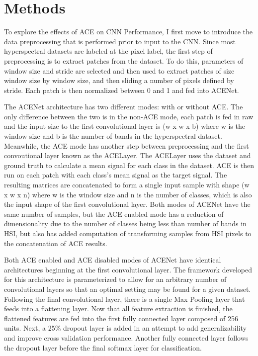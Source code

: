 \documentclass[12pt]{article}
\begin{document}
%
\section{Methods}\label{sec:methods}
To explore the effects of ACE on CNN Performance, I first move to introduce the data preprocessing that is performed prior to input to the CNN.
%
Since most hyperspectral datasets are labeled at the pixel label, the first step of preprocessing is to extract patches from the dataset.
%
To do this, parameters of window size and stride are selected and then used to extract patches of size window size by window size, and then sliding a number of pixels defined by stride.
%
Each patch is then normalized between 0 and 1 and fed into ACENet.

The ACENet architecture has two different modes: with or without ACE.
%
The only difference between the two is in the non-ACE mode, each patch is fed in raw and the input size to the first convolutional layer is (w x w x b) where w is the window size and b is the number of bands in the hyperspectral dataset.
%
Meanwhile, the ACE mode has another step between preprocessing and the first convoutional layer known as the ACELayer.
%
The ACELayer uses the dataset and ground truth to calculate a mean signal for each class in the dataset.
%
ACE is then run on each patch with each class's mean signal as the target signal. 
%
The resulting matrices are concatenated to form a single input sample with shape (w x w x n) where w is the window size and n is the number of classes, which is also the input shape of the first convolutional layer.
%
Both modes of ACENet have the same number of samples, but the ACE enabled mode has a reduction of dimensionality due to the number of classes being less than number of bands in HSI, but also has added computation of transforming samples from HSI pixels to the concatenation of ACE results.

Both ACE enabled and ACE disabled modes of ACENet have identical architectures beginning at the first convolutional layer.
%
The framework developed for this architecture is parameterized to allow for an arbitrary number of convolutional layers so that an optimal setting may be found for a given dataset.
%
Following the final convolutional layer, there is a single Max Pooling layer that feeds into a flattening layer.
%
Now that all feature extraction is finished, the flattened features are fed into the first fully connected layer composed of 256 units.
%
Next, a 25\% dropout layer is added in an attempt to add generalizability and improve cross validation performance.
%
Another fully connected layer follows the dropout layer before the final softmax layer for classification.
\end{document}
